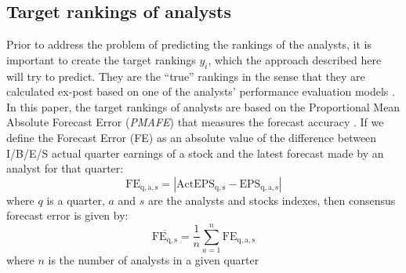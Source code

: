 


\subsection{Target  rankings of analysts}
Prior to address the problem of predicting the rankings of the analysts, it is important to create the target rankings $y_i$, which the approach described here will try to predict. They are the ``true'' rankings in the sense that they are calculated ex-post based on one of the analysts' performance evaluation models \citep{clement1999,brown2001,creamer2009}. In this paper, the target rankings of analysts are based on the Proportional  Mean Absolute Forecast Error (\textit{PMAFE}) that measures the forecast accuracy \citep{brown2001}. If we define the  Forecast Error  (FE) as an absolute value of the difference between I/B/E/S actual quarter earnings of a stock and the latest forecast made by an analyst for that quarter: 
\begin{equation}
\mathrm{FE_{q,a,s}}=|\mathrm{ActEPS_{q,s}}-\mathrm{EPS_{q,a,s}}|
\end{equation}
where $q$ is a quarter, $a$ and $s$ are the analysts and stocks indexes, then consensus forecast error is given by:
\begin{equation}
\mathrm{\overline{FE_{q,s}}}=\frac{1}{n}\sum_{a=1}^n \mathrm{FE_{q,a,s}}
\end{equation}
where $n$ is the number of analysts in a given quarter 


